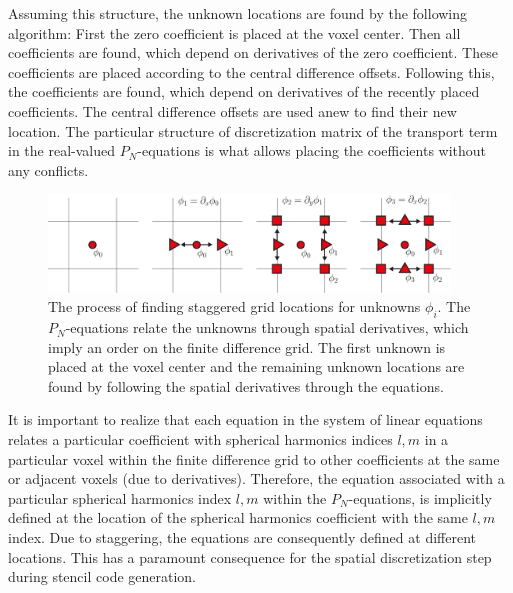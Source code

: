 Assuming this structure, the unknown locations are found by the following algorithm: First the zero coefficient is placed at the voxel center. Then all coefficients are found, which depend on derivatives of the zero coefficient. These coefficients are placed according to the central difference offsets. Following this, the coefficients are found, which depend on derivatives of the recently placed coefficients. The central difference offsets are used anew to find their new location. The particular structure of discretization matrix of the transport term in the real-valued $P_N$-equations is what allows placing the coefficients without any conflicts. 
\begin{figure}[h]
\centering
\includegraphics[width=0.95\textwidth]{04_pn_method/figures/fig_staggered_grid_finding_locations.pdf}
\caption{The process of finding staggered grid locations for unknowns $\phi_i$. The $P_N$-equations relate the unknowns through spatial derivatives, which imply an order on the finite difference grid. The first unknown is placed at the voxel center and the remaining unknown locations are found by following the spatial derivatives through the equations.}
\label{fig:staggered_grid_placement}
\end{figure}

It is important to realize that each equation in the system of linear equations relates a particular coefficient with spherical harmonics indices $l,m$ in a particular voxel within the finite difference grid to other coefficients at the same or adjacent voxels (due to derivatives). Therefore, the equation associated with a particular spherical harmonics index $l,m$ within the $P_N$-equations, is implicitly defined at the location of the spherical harmonics coefficient with the same $l,m$ index. Due to staggering, the equations are consequently defined at different locations. This has a paramount consequence for the spatial discretization step during stencil code generation.


